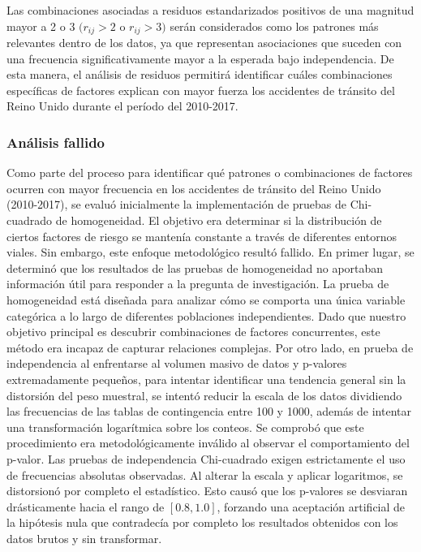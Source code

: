 \documentclass[12pt]{article}
\begin{document}
Las combinaciones asociadas a residuos estandarizados positivos de una magnitud mayor a 2 o 3 $(r_{ij}>2$ o $ r_{ij}>3)$ serán considerados como los patrones más relevantes 
dentro de los datos, ya que representan asociaciones que suceden con una frecuencia significativamente mayor a la esperada bajo independencia.
 De esta manera, el análisis de residuos permitirá identificar cuáles combinaciones específicas de factores explican con mayor fuerza los accidentes
 de tránsito del Reino Unido durante el período del 2010-2017.


\subsubsection{Análisis fallido}
Como parte del proceso para identificar qué patrones o combinaciones de factores ocurren con mayor frecuencia en los accidentes de tránsito del Reino Unido (2010-2017), se evaluó inicialmente la implementación de pruebas de Chi-cuadrado de homogeneidad. El objetivo era determinar si la distribución de ciertos factores de riesgo se mantenía constante a través de diferentes entornos viales. Sin embargo, este enfoque metodológico resultó fallido.
En primer lugar, se determinó que los resultados de las pruebas de homogeneidad no aportaban información útil para responder a la pregunta de investigación. La prueba de homogeneidad está diseñada para analizar cómo se comporta una única variable categórica a lo largo de diferentes poblaciones independientes. Dado que nuestro objetivo principal es descubrir combinaciones de factores concurrentes, este método era incapaz de capturar relaciones complejas.
Por otro lado, en prueba de independencia al enfrentarse al volumen masivo de datos y p-valores extremadamente pequeños, para intentar identificar una tendencia general sin la distorsión del peso muestral, se intentó reducir la escala de los datos dividiendo las frecuencias de las tablas de contingencia entre 100 y 1000, además de intentar una transformación logarítmica sobre los conteos.
Se comprobó que este procedimiento era metodológicamente inválido al observar el comportamiento del p-valor. Las pruebas de independencia Chi-cuadrado exigen estrictamente el uso de frecuencias absolutas observadas. Al alterar la escala y aplicar logaritmos, se distorsionó por completo el estadístico. Esto causó que los p-valores se desviaran drásticamente hacia el rango de $[0.8, 1.0]$, forzando una aceptación artificial de la hipótesis nula que contradecía por completo los resultados obtenidos con los datos brutos y sin transformar.
\end{document}
